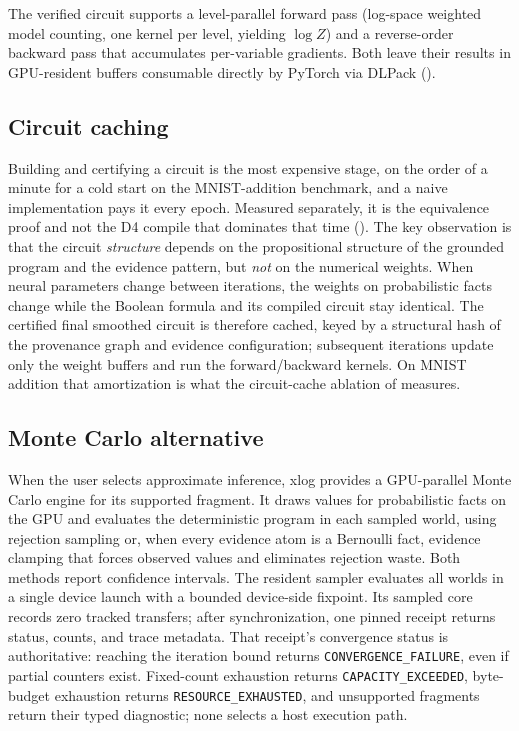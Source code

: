 The verified circuit supports a level-parallel forward pass (log-space weighted model counting, one kernel per level, yielding $\log Z$) and a reverse-order backward pass that accumulates per-variable gradients. Both leave their results in GPU-resident buffers consumable directly by PyTorch via DLPack ().

\subsection{Circuit caching}

Building and certifying a circuit is the most expensive stage, on the order of a minute for a cold start on the MNIST-addition benchmark, and a naive implementation pays it every epoch. Measured separately, it is the equivalence proof and not the D4 compile that dominates that time (). The key observation is that the circuit \emph{structure} depends on the propositional structure of the grounded program and the evidence pattern, but \emph{not} on the numerical weights. When neural parameters change between iterations, the weights on probabilistic facts change while the Boolean formula and its compiled circuit stay identical. The certified final smoothed circuit is therefore cached, keyed by a structural hash of the provenance graph and evidence configuration; subsequent iterations update only the weight buffers and run the forward/backward kernels. On MNIST addition that amortization is what the circuit-cache ablation of  measures.

\subsection{Monte Carlo alternative}

When the user selects approximate inference, xlog provides a GPU-parallel Monte Carlo engine for its supported fragment. It draws values for probabilistic facts on the GPU and evaluates the deterministic program in each sampled world, using rejection sampling or, when every evidence atom is a Bernoulli fact, evidence clamping that forces observed values and eliminates rejection waste. Both methods report confidence intervals. The resident sampler evaluates all worlds in a single device launch with a bounded device-side fixpoint. Its sampled core records zero tracked transfers; after synchronization, one pinned receipt returns status, counts, and trace metadata. That receipt's convergence status is authoritative: reaching the iteration bound returns \texttt{CONVERGENCE\_FAILURE}, even if partial counters exist. Fixed-count exhaustion returns \texttt{CAPACITY\_EXCEEDED}, byte-budget exhaustion returns \texttt{RESOURCE\_EXHAUSTED}, and unsupported fragments return their typed diagnostic; none selects a host execution path.
